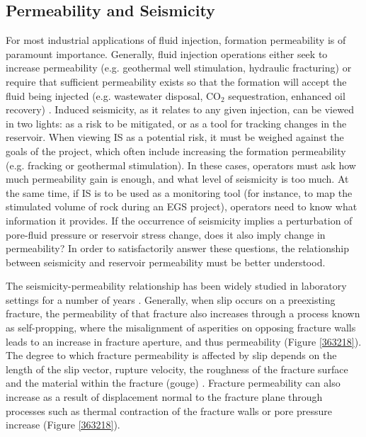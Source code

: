 \subsection{Permeability and Seismicity}
For most industrial applications of fluid injection, formation permeability is of paramount importance. Generally, fluid injection operations either seek to increase permeability (e.g. geothermal well stimulation, hydraulic fracturing) or require that sufficient permeability exists so that the formation will accept the fluid being injected (e.g. wastewater disposal, CO$_2$ sequestration, enhanced oil recovery) \citep{2013}. Induced seismicity, as it relates to any given injection, can be viewed in two lights: as a risk to be mitigated, or as a tool for tracking changes in the reservoir. When viewing IS as a potential risk, it must be weighed against the goals of the project, which often include increasing the formation permeability (e.g. fracking or geothermal stimulation). In these cases, operators must ask how much permeability gain is enough, and what level of seismicity is too much. At the same time, if IS is to be used as a monitoring tool (for instance, to map the stimulated volume of rock during an EGS project), operators need to know what information it provides. If the occurrence of seismicity implies a perturbation of pore-fluid pressure or reservoir stress change, does it also imply change in permeability? In order to satisfactorily answer these questions, the relationship between seismicity and reservoir permeability must be better understood.

The seismicity-permeability relationship has been widely studied in laboratory settings for a number of years \citep[e.g.][and citations therein]{Lee_2002}. Generally, when slip occurs on a preexisting fracture, the permeability of that fracture also increases through a process known as self-propping, where the misalignment of asperities on opposing fracture walls leads to an increase in fracture aperture, and thus permeability (Figure \ref{363218}). The degree to which fracture permeability is affected by slip depends on the length of the slip vector, rupture velocity, the roughness of the fracture surface and the material within the fracture (gouge) \citep{Fang_2017}. Fracture permeability can also increase as a result of displacement normal to the fracture plane through processes such as thermal contraction of the fracture walls or pore pressure increase (Figure \ref{363218}).

